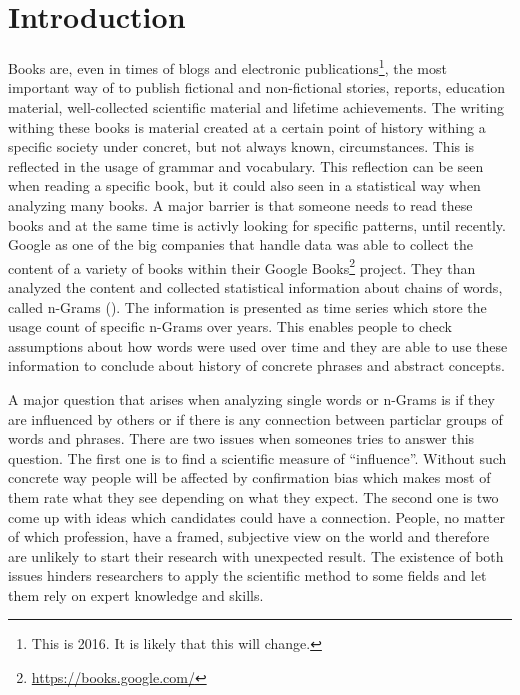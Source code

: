 \chapter{Introduction}
\label{ch:Introduction}

Books are, even in times of blogs and electronic publications\footnote{This is 2016. It is likely that this will change.}, the most important way of to publish fictional and non-fictional stories, reports, education material, well-collected scientific material and lifetime achievements. The writing withing these books is material created at a certain point of history withing a specific society under concret, but not always known, circumstances. This is reflected in the usage of grammar and vocabulary. This reflection can be seen when reading a specific book, but it could also seen in a statistical way when analyzing many books. A major barrier is that someone needs to read these books and at the same time is activly looking for specific patterns, until recently. Google as one of the big companies that handle data was able to collect the content of a variety of books within their Google Books\footnote{\url{https://books.google.com/}} project. They than analyzed the content and collected statistical information about chains of words, called n-Grams (\cite{Google_nGrams}). The information is presented as time series which store the usage count of specific n-Grams over years. This enables people to check assumptions about how words were used over time and they are able to use these information to conclude about history of concrete phrases and abstract concepts.

A major question that arises when analyzing single words or n-Grams is if they are influenced by others or if there is any connection between particlar groups of words and phrases. There are two issues when someones tries to answer this question. The first one is to find a scientific measure of \enquote{influence}. Without such concrete way people will be affected by confirmation bias which makes most of them rate what they see depending on what they expect. The second one is two come up with ideas which candidates could have a connection. People, no matter of which profession, have a framed, subjective view on the world and therefore are unlikely to start their research with unexpected result. The existence of both issues hinders researchers to apply the scientific method to some fields and let them rely on expert knowledge and skills.

